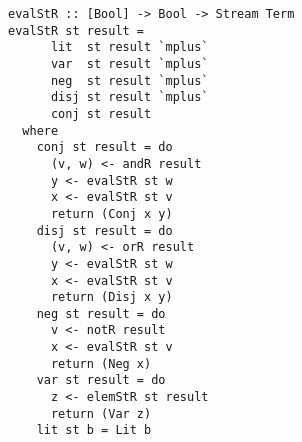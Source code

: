 

\begin{figure}[!t]
  \centering
  \begin{minipage}{0.49\textwidth}
    \begin{lstlisting}[label={eval_st_r}, caption={Functional implementation of the direction \lstinline{evalo out in in}}, captionpos=b, frame=tb]
evalStR :: [Bool] -> Bool -> Stream Term
evalStR st result =
      lit  st result `mplus`
      var  st result `mplus`
      neg  st result `mplus`
      disj st result `mplus`
      conj st result
  where
    conj st result = do
      (v, w) <- andR result
      y <- evalStR st w
      x <- evalStR st v
      return (Conj x y)
    disj st result = do
      (v, w) <- orR result
      y <- evalStR st w
      x <- evalStR st v
      return (Disj x y)
    neg st result = do
      v <- notR result
      x <- evalStR st v
      return (Neg x)
    var st result = do
      z <- elemStR st result
      return (Var z)
    lit st b = Lit b
    \end{lstlisting}
  \end{minipage}
\end{figure}


